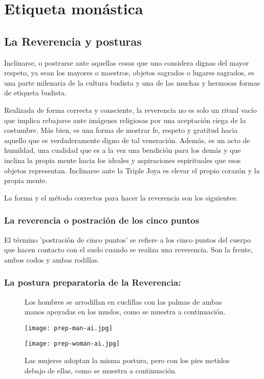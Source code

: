 \chapter{Etiqueta monástica}
\label{etiquette}

\section{La Reverencia y posturas}

Inclinarse, o postrarse ante aquellas cosas que uno considera dignas del mayor respeto, ya sean los mayores o maestros, objetos sagrados o lugares sagrados, es una parte milenaria de la cultura budista y una de las muchas y hermosas formas de etiqueta budista.

Realizada de forma correcta y consciente, la reverencia no es solo un ritual vacío que implica rebajarse ante imágenes religiosas por una aceptación ciega de la costumbre. Más bien, es una forma de mostrar fe, respeto y gratitud hacia aquello que es verdaderamente digno de tal veneración. Además, es un acto de humildad, una cualidad que es a la vez una bendición para los demás y que inclina la propia mente hacia los ideales y aspiraciones espirituales que esos objetos representan. Inclinarse ante la Triple Joya es elevar el propio corazón y la propia mente.

La forma y el método correctos para hacer la reverencia son los siguientes:

\subsection{La reverencia o postración de los cinco puntos}

El término 'postración de cinco puntos' se refiere a los cinco puntos del cuerpo que hacen contacto con el suelo cuando se realiza una reverencia. Son la frente, ambos codos y ambas rodillas.

\captionsetup{font=small, labelformat=empty, position=above}

\subsection{La postura preparatoria de la Reverencia:}

\begin{figure}[h]
	\centering
	
	\begin{minipage}{0.49\textwidth}
		\centering
		\caption{Los hombres se arrodillan en cuclillas con las palmas de ambas manos apoyadas en los muslos, como se muestra a continuación.}
		\texttt{[image: prep-man-ai.jpg]}
		
	\end{minipage}
	\hfill
	\begin{minipage}{0.49\textwidth}
		\centering
		\caption{Las mujeres adoptan la misma postura, pero con los pies metidos debajo de ellas, como se muestra a continuación.}
		\texttt{[image: prep-woman-ai.jpg]}
		
	\end{minipage}
	
\end{figure}


